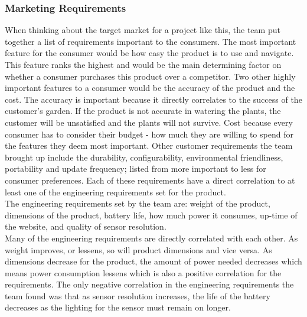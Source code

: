 \subsubsection{Marketing Requirements}
When thinking about the target market for a project like this, the team put together a list of requirements important to the consumers. The most important feature for the consumer would be how easy the product is to use and navigate. This feature ranks the highest and would be the main determining factor on whether a consumer purchases this product over a competitor. Two other highly important features to a consumer would be the accuracy of the product and the cost. The accuracy is important because it directly correlates to the success of the customer's garden. If the product is not accurate in watering the plants, the customer will be unsatisfied and the plants will not survive. Cost because every consumer has to consider their budget - how much they are willing to spend for the features they deem most important. Other customer requirements the team brought up include the durability, configurability, environmental friendliness, portability and update frequency; listed from more important to less for consumer preferences. Each of these requirements have a direct correlation to at least one of the engineering requirements set for the product. \\

The engineering requirements set by the team are: weight of the product, dimensions of the product, battery life, how much power it consumes, up-time of the website, and quality of sensor resolution. \\

Many of the engineering requirements are directly correlated with each other. As weight improves, or lessens, so will product dimensions and vice versa. As dimensions decrease for the product, the amount of power needed decreases which means power consumption lessens which is also a positive correlation for the requirements. The only negative correlation in the engineering requirements the team found was that as sensor resolution increases, the life of the battery decreases as the lighting for the sensor must remain on longer. \\
 


